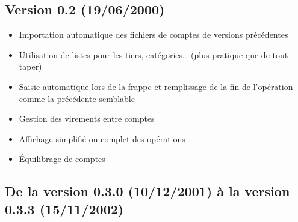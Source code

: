 \subsection{Version 0.2 \textnormal{(19/06/2000)}}

\begin{itemize}
	\item Importation automatique des fichiers de comptes de versions précédentes
	\item Utilisation de listes pour les tiers, catégories\dots{} (plus pratique que de tout taper)
	\item Saisie automatique lors de la frappe et remplissage de la fin de l'opération comme la précédente semblable
	\item Gestion des virements entre comptes
	\item Affichage simplifié ou complet des opérations
	\item Équilibrage de comptes
\end{itemize}

\subsection{De la version 0.3.0 \textnormal{(10/12/2001)} à la version 0.3.3 \textnormal{(15/11/2002)}}

